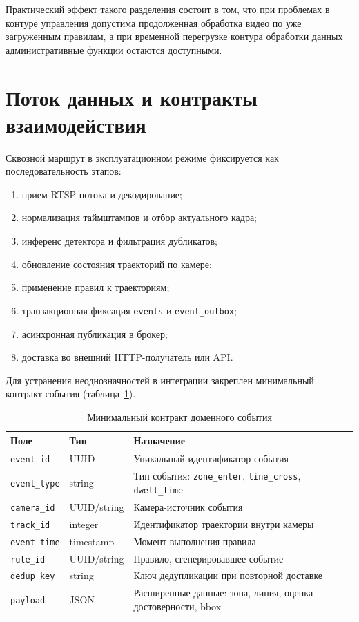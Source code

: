 Практический эффект такого разделения состоит в том, что при проблемах в контуре управления допустима продолженная обработка видео по уже загруженным правилам, а при временной перегрузке контура обработки данных административные функции остаются доступными.

\section{Поток данных и контракты взаимодействия}

Сквозной маршрут в эксплуатационном режиме фиксируется как последовательность этапов:
\begin{enumerate}
    \item прием RTSP-потока и декодирование;
    \item нормализация таймштампов и отбор актуального кадра;
    \item инференс детектора и фильтрация дубликатов;
    \item обновление состояния траекторий по камере;
    \item применение правил к траекториям;
    \item транзакционная фиксация \texttt{events} и \texttt{event\_outbox};
    \item асинхронная публикация в брокер;
    \item доставка во внешний HTTP-получатель или API.
\end{enumerate}

Для устранения неоднозначностей в интеграции закреплен минимальный контракт события (таблица~\ref{tab:short_event_contract}).

\begin{table}[H]
\caption{Минимальный контракт доменного события}
\label{tab:short_event_contract}
\begin{tabularx}{\textwidth}{>{\raggedright\arraybackslash}p{}p{}X}
\toprule
Поле & Тип & Назначение \\
\midrule
\texttt{event\_id} & UUID & Уникальный идентификатор события \\
\texttt{event\_type} & string & Тип события: \texttt{zone\_enter}, \texttt{line\_cross}, \texttt{dwell\_time} \\
\texttt{camera\_id} & UUID/string & Камера-источник события \\
\texttt{track\_id} & integer & Идентификатор траектории внутри камеры \\
\texttt{event\_time} & timestamp & Момент выполнения правила \\
\texttt{rule\_id} & UUID/string & Правило, сгенерировавшее событие \\
\texttt{dedup\_key} & string & Ключ дедупликации при повторной доставке \\
\texttt{payload} & JSON & Расширенные данные: зона, линия, оценка достоверности, bbox \\
\bottomrule
\end{tabularx}
\end{table}


